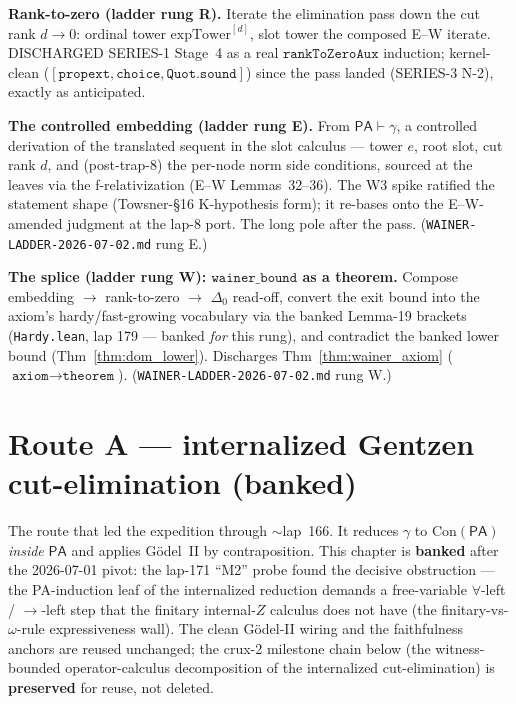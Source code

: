 \begin{theorem}\label{thm:zeh_rank_zero}
  \leanok
\textbf{Rank-to-zero (ladder rung R).}  Iterate the elimination pass down the cut rank
\(d \to 0\): ordinal tower \(\mathrm{expTower}^{[d]}\), slot tower the composed E--W iterate.
DISCHARGED SERIES-1 Stage~4 as a real \(\texttt{rankToZeroAux}\) induction; kernel-clean
(\([\texttt{propext},\texttt{choice},\texttt{Quot.sound}]\)) since the pass landed (SERIES-3
N-2), exactly as anticipated.
\end{theorem}

\begin{theorem}\label{thm:zeh_embedding}
  \notready
\textbf{The controlled embedding (ladder rung E).}  From \(\mathsf{PA}\vdash\gamma\), a controlled
derivation of the translated sequent in the slot calculus --- tower \(e\), root slot, cut rank
\(d\), and (post-trap-8) the per-node norm side conditions, sourced at the leaves via the
f-relativization (E--W Lemmas~32--36).  The W3 spike ratified the statement shape
(Towsner-\S16 K-hypothesis form); it re-bases onto the E--W-amended judgment at the lap-8 port.
The long pole after the pass.  (\texttt{WAINER-LADDER-2026-07-02.md} rung E.)
\end{theorem}

\begin{theorem}\label{thm:wainer_splice}
  \notready
\textbf{The splice (ladder rung W): \(\texttt{wainer\_bound}\) as a theorem.}  Compose
embedding \(\to\) rank-to-zero \(\to\) \(\Delta_0\) read-off, convert the exit bound into the
axiom's hardy/fast-growing vocabulary via the banked Lemma-19 brackets (\texttt{Hardy.lean},
lap 179 --- banked \emph{for} this rung), and contradict the banked lower bound
(Thm~\ref{thm:dom_lower}).  Discharges Thm~\ref{thm:wainer_axiom}
(\(\texttt{axiom}\to\texttt{theorem}\)).  (\texttt{WAINER-LADDER-2026-07-02.md} rung W.)
\end{theorem}


\chapter{Route A --- internalized Gentzen cut-elimination (banked)}\label{chp:routeA}

The route that led the expedition through \(\sim\)lap~166.  It reduces \(\gamma\) to
\(\mathrm{Con}(\mathsf{PA})\) \emph{inside} \(\mathsf{PA}\) and applies Gödel~II by contraposition.  This
chapter is \textbf{banked} after the 2026-07-01 pivot: the lap-171 ``M2'' probe found the decisive
obstruction --- the PA-induction leaf of the internalized reduction demands a free-variable
\(\forall\)-left / \(\to\)-left step that the finitary internal-\(Z\) calculus does not have (the
finitary-vs-\(\omega\)-rule expressiveness wall).  The clean Gödel-II wiring and the faithfulness
anchors are reused unchanged; the crux-2 milestone chain below (the witness-bounded operator-calculus
decomposition of the internalized cut-elimination) is \textbf{preserved} for reuse, not deleted.

